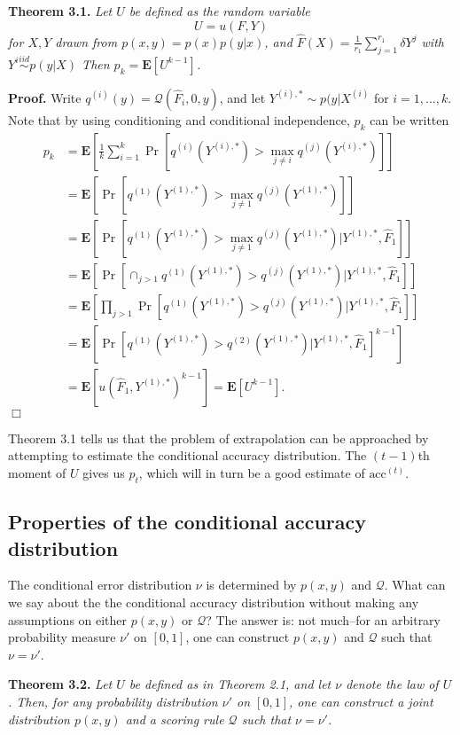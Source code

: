 \documentclass{article}
\newcommand{\E}{\textbf{E}}
\begin{document}
\noindent\textbf{Theorem 3.1.} \emph{
Let $U$ be defined as the random variable
\[U = u(F, Y)\]
for $X, Y$ drawn from $p(x, y) = p(x) p(y|x)$,
and $\hat{F}(X) = \frac{1}{r_1}\sum_{j=1}^{r_1} \delta{Y^j}$ with $Y^i \stackrel{iid}{\sim} p(y|X)$
Then $p_k = \E[U^{k-1}]$.
}

\noindent\textbf{Proof.}  
Write $q^{(i)}(y) = \mathcal{Q}(\hat{F}_i, 0, y)$, and let $Y^{(i), *} \sim p(y|X^{(i)}$ for $i = 1,\hdots, k$.
Note that by using conditioning and
conditional independence, $p_k$ can be written
\begin{align*}
p_k &= \E\left[ \frac{1}{k}\sum_{i=1}^k  \Pr[q^{(i)}(Y^{(i), *}) > \max_{j\neq i} q^{(j)}(Y^{(i), *})] \right]
\\&= \E\left[ \Pr[q^{(1)}(Y^{(1), *}) > \max_{j\neq 1} q^{(j)}(Y^{(1), *})] \right]
\\&= \E[\Pr[q^{(1)}(Y^{(1), *}) > \max_{j\neq 1} q^{(j)}(Y^{(1), *})|Y^{(1), *}, \hat{F}_1]]
\\&= \E[\Pr[\cap_{j > 1} q^{(1)}(Y^{(1), *}) > q^{(j)}(Y^{(1), *})|Y^{(1), *}, \hat{F}_1]]
\\&= \E[\prod_{j > 1}\Pr[q^{(1)}(Y^{(1), *}) > q^{(j)}(Y^{(1), *})|Y^{(1), *}, \hat{F}_1]]
\\&= \E[\Pr[q^{(1)}(Y^{(1), *}) > q^{(2)}(Y^{(1), *})|Y^{(1), *}, \hat{F}_1]^{k-1}]
\\&= \E[u(\hat{F}_1, Y^{(1), *})^{k-1}] = \E[U^{k-1}].
\end{align*}
$\Box$

Theorem 3.1 tells us that the problem of extrapolation can be
approached by attempting to estimate the conditional accuracy
distribution.  The $(t-1)$th moment of $U$ gives us $p_t$, which will
in turn be a good estimate of $\text{acc}^{(t)}$.

\subsection{Properties of the conditional accuracy distribution}

The conditional error distribution $\nu$ is determined by $p(x, y)$
and $\mathcal{Q}$.  What can we say about the the conditional accuracy
distribution without making any assumptions on either $p(x, y)$ or
$\mathcal{Q}$?  The answer is: not much--for an arbitrary probability
measure $\nu'$ on $[0,1]$, one can construct $p(x, y)$ and
$\mathcal{Q}$ such that $\nu = \nu'$.

\noindent\textbf{Theorem 3.2.} \emph{ Let $U$ be defined as in Theorem
  2.1, and let $\nu$ denote the law of $U$.  Then, for any probability
  distribution $\nu'$ on $[0,1]$, one can construct a joint
  distribution $p(x, y)$ and a scoring rule $\mathcal{Q}$ such that 
  $\nu = \nu'$.
}
\end{document}
